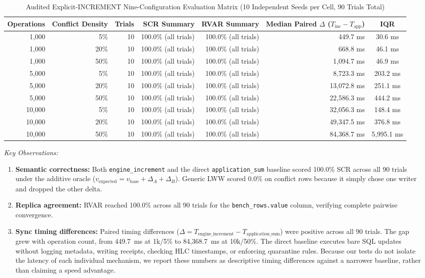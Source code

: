 \documentclass[conference]{IEEEtran}
\begin{document}
\begin{table}[!t]
\centering
\caption{Audited Explicit-INCREMENT Nine-Configuration Evaluation Matrix (10 Independent Seeds per Cell, 90 Trials Total)}
\label{tab:inc_matrix}
\begin{tabular}{rrrrrrc}
\toprule
\textbf{Operations} & \textbf{Conflict Density} & \textbf{Trials} & \textbf{SCR Summary} & \textbf{RVAR Summary} & \textbf{Median Paired $\Delta$ ($T_{\text{inc}} - T_{\text{app}}$)} & \textbf{IQR} \\
\midrule
1,000 & 5\% & 10 & 100.0\% (all trials) & 100.0\% (all trials) & 449.7 ms & 30.6 ms \\
1,000 & 20\% & 10 & 100.0\% (all trials) & 100.0\% (all trials) & 668.8 ms & 46.1 ms \\
1,000 & 50\% & 10 & 100.0\% (all trials) & 100.0\% (all trials) & 1,094.7 ms & 46.9 ms \\
5,000 & 5\% & 10 & 100.0\% (all trials) & 100.0\% (all trials) & 8,723.3 ms & 203.2 ms \\
5,000 & 20\% & 10 & 100.0\% (all trials) & 100.0\% (all trials) & 13,072.8 ms & 251.1 ms \\
5,000 & 50\% & 10 & 100.0\% (all trials) & 100.0\% (all trials) & 22,586.3 ms & 444.2 ms \\
10,000 & 5\% & 10 & 100.0\% (all trials) & 100.0\% (all trials) & 32,056.3 ms & 148.4 ms \\
10,000 & 20\% & 10 & 100.0\% (all trials) & 100.0\% (all trials) & 49,347.5 ms & 376.8 ms \\
10,000 & 50\% & 10 & 100.0\% (all trials) & 100.0\% (all trials) & 84,368.7 ms & 5,995.1 ms \\
\bottomrule
\end{tabular}
\end{table}

\textit{Key Observations:}
\begin{enumerate}
    \item \textbf{Semantic correctness:} Both \texttt{engine\_increment} and the direct \texttt{application\_sum} baseline scored 100.0\% SCR across all 90 trials under the additive oracle ($v_{\text{expected}} = v_{\text{base}} + \Delta_A + \Delta_B$). Generic LWW scored 0.0\% on conflict rows because it simply chose one writer and dropped the other delta.
    \item \textbf{Replica agreement:} RVAR reached 100.0\% across all 90 trials for the \texttt{bench\_rows.value} column, verifying complete pairwise convergence.
    \item \textbf{Sync timing differences:} Paired timing differences ($\Delta = T_{\text{engine\_increment}} - T_{\text{application\_sum}}$) were positive across all 90 trials. The gap grew with operation count, from 449.7~ms at 1k/5\% to 84,368.7~ms at 10k/50\%. The direct baseline executes bare SQL updates without logging metadata, writing receipts, checking HLC timestamps, or enforcing quarantine rules. Because our tests do not isolate the latency of each individual mechanism, we report these numbers as descriptive timing differences against a narrower baseline, rather than claiming a speed advantage.
\end{enumerate}
\end{document}
